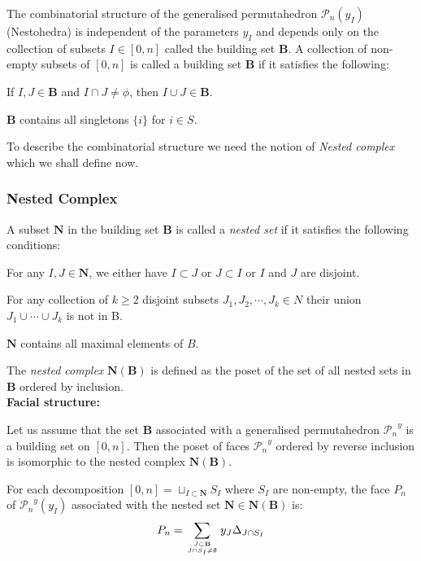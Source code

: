 \documentclass[hidelinks,12pt]{article}
\newcommand{\bea}[1]{\begin{eqnarray}\label{#1} }
\newcommand{\eea}{\end{eqnarray}}
\def\bea{\begin{eqnarray}}
\def\eea{\end{eqnarray}}
\begin{document}
 The combinatorial structure of the generalised permutahedron ${\mathscr P_n({y_I})}$ (Nestohedra) is independent of the parameters $y_I$ and depends only on the collection of subsets $I \in [0,n]$ called the  building set ${\mathbf B}$.  
A collection of non-empty subsets of $[0,n]$ is called a building set ${\mathbf B}$ if it satisfies the following:
\begin{compactenum}[\quad (1)]
    \item If $I,J \in {\mathbf B}$ and $I \cap J \neq \phi $, then $I \cup J \in {\mathbf B}$.
    \item ${\mathbf B}$ contains all singletons $\{ i\}$ for $i \in S$.
\end{compactenum}
To describe the combinatorial structure we need the notion of {\it Nested complex} which we shall define now.

\subsubsection*{Nested Complex}
A subset ${\mathbf N}$ in the building set ${\mathbf B}$ is called a {\it nested set} if it satisfies the following conditions:
\begin{compactenum}[\quad (1)]
    \item For any $I,J \in {\mathbf N}$, we either have $I \subset J$ or $J\subset I$ or $I$ and $J$ are disjoint.
    \item For any collection of $k \geq 2$ disjoint subsets $J_1,J_2,\cdots, J_k \in N$ their union $J_1 \cup \cdots \cup J_k$ is not in B.
    \item ${\mathbf N}$ contains all maximal elements of $B$.
\end{compactenum}
The {\it nested complex} ${\mathbf N}({\mathbf B})$ is defined as the poset of the set of all nested sets in ${\mathbf B}$ ordered by inclusion.\\

 {\bf Facial structure:} 
 
 Let us assume that the set ${\mathbf B}$ associated with a generalised permutahedron ${\mathscr P_n}^{y}$ is a building set on $[0,n]$. Then the poset of faces ${\mathscr P_n}^{y}$ ordered by reverse inclusion is isomorphic to the nested complex ${\mathbf N}({\mathbf B})$. 

For each decomposition $[0,n]=  \sqcup_{I \subset {\mathbf N} } S_I $ where $S_I$ are non-empty, the face $P_n$ of ${\mathscr P_n}^{y}(y_I)$ associated with the nested set ${\mathbf N} \in {\mathbf N}({\mathbf B})$ is:
\bea
P_n = \sum_{{J \subset {\mathbf B}}\atop{J \cap S_I \neq \emptyset}} y_{J} \Delta_{J \cap S_I}
\eea
\end{document}
